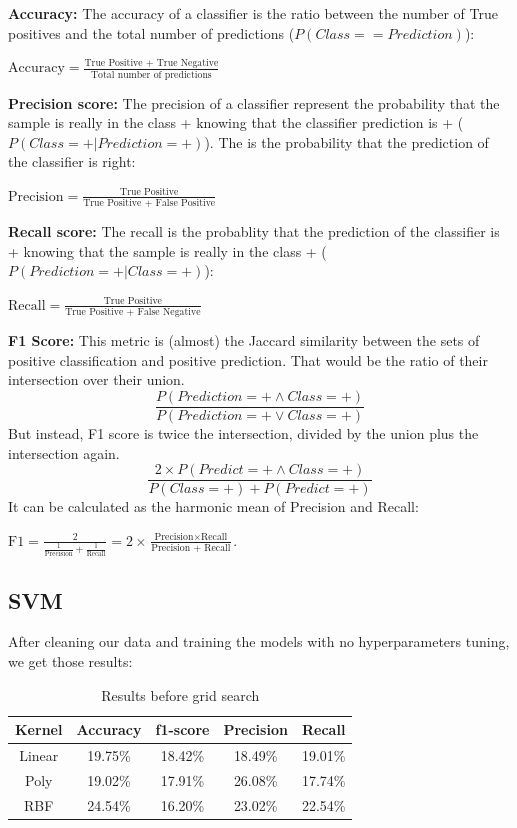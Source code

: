 \documentclass[twocolumn]{article}
\begin{document}
\textbf{Accuracy:} The accuracy of a classifier is the ratio between the number of True positives and the total number of predictions ($P(Class == Prediction)$): 

\(\displaystyle \text{Accuracy} = \frac{\text{True Positive + True Negative}}{\text{Total number of predictions}} \)

\textbf{Precision score:} The precision of a classifier represent the probability that the sample is really in the class + knowing that the classifier prediction is + ($P(Class=+ | Prediction = +)$). The is the probability that the prediction of the classifier is right:

\(\displaystyle \text{Precision} = \frac{\text{True Positive}}{\text{True Positive + False Positive}}\)

\textbf{Recall score:} The recall is the probablity that the prediction of the classifier is + knowing that the sample is really in the class + ($P(Prediction=+ | Class = +)$):

\(\displaystyle \text{Recall} = \frac{\text{True Positive}}{\text{True Positive + False Negative}}\)


\textbf{F1 Score:} This metric is (almost) the Jaccard similarity between the sets of positive classification and positive prediction. That would be the ratio of their intersection over their union. 
$$\frac{P(Prediction=+ \land Class = +)}{P(Prediction=+ \lor Class = +)}$$
But instead, F1 score is twice the intersection, divided by the union plus the intersection again.
$$\frac{2 \times P(Predict =+ \land Class = +)}{P(Class = +) +  P(Predict=+)}$$
It can be calculated as the harmonic mean of Precision and Recall:

\(\displaystyle \text{F1} = \frac{2}{\frac{1}{\text{Precision}} + \frac{1}{\text{Recall}}} \displaystyle = 2 \times \frac{\text{Precision}\times\text{Recall}}{\text{Precision + Recall}} \). 

\subsection{SVM}
After cleaning our data and training the models with no hyperparameters tuning, we get those results:

\begin{table}[h]
    \centering
    \begin{tabular}{|c|c|c|c|c|}
    \hline
      Kernel & Accuracy & f1-score & Precision & Recall\\  
      \hline
      Linear & 19.75\% & 18.42\% & 18.49\% & 19.01\%\\
        \hline
      Poly & 19.02\% & 17.91\% & 26.08\% & 17.74\% \\
        \hline
      RBF & 24.54\% & 16.20\% & 23.02\% & 22.54\% \\
    \hline
    \end{tabular}
    \label{tab:my_label}
    \caption{Results before grid search}

\end{table}
\end{document}
